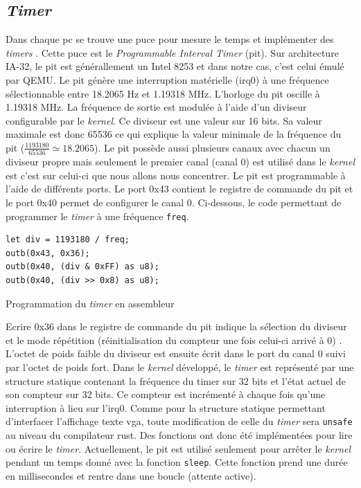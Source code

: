 
\subsection{\textit{Timer}}
Dans chaque \acrshort{pc} se trouve une puce pour mesure le temps et implémenter
des \textit{timers} \cite{ref42}. Cette puce est le \textit{Programmable Interval Timer}
(\acrshort{pit}). Sur architecture \acrshort{IA-32}, le \acrshort{pit} est générallement
un Intel 8253 et dans notre cas, c'est celui émulé par QEMU. Le \acrshort{pit}
génère une interruption matérielle (\acrshort{irq}0) à une fréquence sélectionnable
entre 18.2065 Hz et 1.19318 MHz. L'horloge du \acrshort{pit} oscille à 1.19318 MHz.
La fréquence de sortie est modulée à l'aide d'un diviseur configurable par le
\textit{kernel}. Ce diviseur est une valeur sur 16 bits. Sa valeur maximale est
donc 65536 ce qui explique la valeur minimale de la fréquence du \acrshort{pit}
($\frac{1193180}{65536} \simeq 18.2065$). Le \acrshort{pit} possède aussi plusieurs
canaux avec chacun un diviseur propre mais seulement le premier canal (canal 0)
est utilisé dans le \textit{kernel} est c'est sur celui-ci que nous allons nous
concentrer. Le \acrshort{pit} est programmable à l'aide de différents ports.
Le port 0x43 contient le registre de commande du \acrshort{pit} et le port 0x40
permet de configurer le canal 0. Ci-dessous, le code permettant de programmer
le \textit{timer} à une fréquence \texttt{freq}.

\begin{code}
\begin{verbatim}
let div = 1193180 / freq;
outb(0x43, 0x36);
outb(0x40, (div & 0xFF) as u8);
outb(0x40, (div >> 0x8) as u8);
\end{verbatim}
\caption{Programmation du \textit{timer} en assembleur}
\label{lst:timer:init}
\end{code} \bigbreak

Ecrire 0x36 dans le registre de commande du \acrshort{pit} indique la sélection
du diviseur et le mode répétition  (réinitialisation du compteur une fois celui-ci
arrivé à 0) \cite{ref42}. L'octet de poids faible du diviseur est ensuite écrit
dans le port du canal 0 suivi par l'octet de poids fort. Dans le \textit{kernel}
développé, le \textit{timer} est représenté par une structure statique contenant
la fréquence du timer sur 32 bits et l'état actuel de son compteur sur 32 bits.
Ce compteur est incrémenté à chaque fois qu'une interruption à lieu sur l'\acrshort{irq}0.
Comme pour la structure statique permettant d'interfacer l'affichage texte \acrshort{vga},
toute modification de celle du \textit{timer} sera \texttt{unsafe}
au niveau du compilateur rust. Des fonctions ont donc été implémentées pour lire
ou écrire le \textit{timer}. Actuellement, le \acrshort{pit} est utilisé seulement
pour arrêter le \textit{kernel} pendant un temps donné avec la fonction \texttt{sleep}.
Cette fonction prend une durée en millisecondes et rentre dans une boucle (attente
active).

